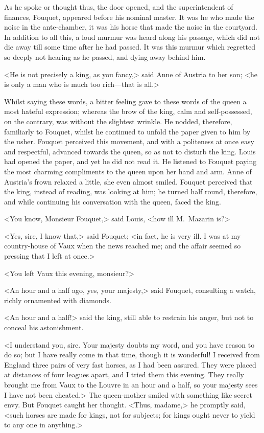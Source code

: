 As he spoke or thought thus, the door opened, and the superintendent of finances, Fouquet, appeared before his nominal master. It was he who made the noise in the ante-chamber, it was his horse that made the noise in the courtyard. In addition to all this, a loud murmur was heard along his passage, which did not die away till some time after he had passed. It was this murmur which  regretted so deeply not hearing as he passed, and dying away behind him.

<He is not precisely a king, as you fancy,> said Anne of Austria to her son; <he is only a man who is much too rich—that is all.>

Whilst saying these words, a bitter feeling gave to these words of the queen a most hateful expression; whereas the brow of the king, calm and self-possessed, on the contrary, was without the slightest wrinkle. He nodded, therefore, familiarly to Fouquet, whilst he continued to unfold the paper given to him by the usher. Fouquet perceived this movement, and with a politeness at once easy and respectful, advanced towards the queen, so as not to disturb the king. Louis had opened the paper, and yet he did not read it. He listened to Fouquet paying the most charming compliments to the queen upon her hand and arm. Anne of Austria's frown relaxed a little, she even almost smiled. Fouquet perceived that the king, instead of reading, was looking at him; he turned half round, therefore, and while continuing his conversation with the queen, faced the king.

<You know, Monsieur Fouquet,> said Louis, <how ill M.~Mazarin is?>

<Yes, sire, I know that,> said Fouquet; <in fact, he is very ill. I was at my country-house of Vaux when the news reached me; and the affair seemed so pressing that I left at once.>

<You left Vaux this evening, monsieur?>

<An hour and a half ago, yes, your majesty,> said Fouquet, consulting a watch, richly ornamented with diamonds.

<An hour and a half!> said the king, still able to restrain his anger, but not to conceal his astonishment.

<I understand you, sire. Your majesty doubts my word, and you have reason to do so; but I have really come in that time, though it is wonderful! I received from England three pairs of very fast horses, as I had been assured. They were placed at distances of four leagues apart, and I tried them this evening. They really brought me from Vaux to the Louvre in an hour and a half, so your majesty sees I have not been cheated.> The queen-mother smiled with something like secret envy. But Fouquet caught her thought. <Thus, madame,> he promptly said, <such horses are made for kings, not for subjects; for kings ought never to yield to any one in anything.>

